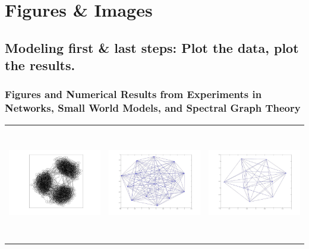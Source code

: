 \def\baselinestretch{1}

\chapter{Figures \& Images}

\section{Modeling first \& last steps: Plot the data, plot the results.}

\subsection{Figures and Numerical Results from Experiments in
Networks, Small World Models, and Spectral Graph Theory}
\begin{tabular}{ |c|c|c| }
\includegraphics[width=5.0cm,height=5.0cm]{images/3Inhomog_Cluster_PreScaleFree.jpg}   &
\includegraphics[width=5.0cm,height=5.0cm]{images/Clique_12_Members.jpg}               &
\includegraphics[width=5.0cm,height=5.0cm]{images/Clique_9_Members.jpg}                 \\

\end{tabular}
